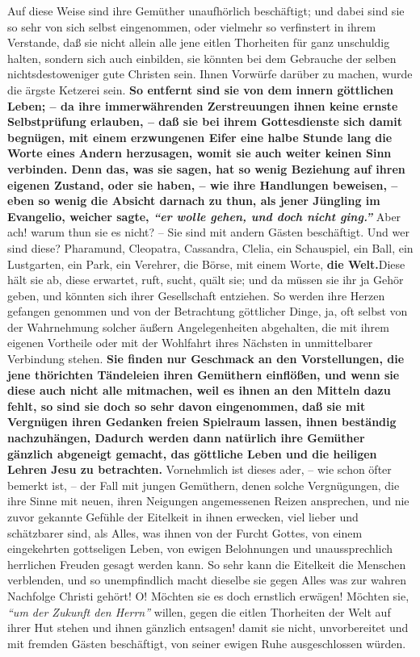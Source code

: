 Auf diese Weise sind ihre Gemüther unaufhörlich beschäftigt; und dabei sind sie
so sehr von sich selbst eingenommen, oder vielmehr so verfinstert in ihrem
Verstande, daß sie nicht allein alle jene eitlen Thorheiten für ganz unschuldig
halten, sondern sich auch einbilden, sie könnten bei dem Gebrauche der selben
nichtsdestoweniger gute Christen sein. Ihnen Vorwürfe
darüber zu machen, wurde
die ärgste Ketzerei sein.
\label{ref:17_04_gottesdienst}
\textbf{So entfernt sind sie von dem innern göttlichen Leben;
-- da ihre immerwährenden Zerstreuungen ihnen keine ernste
Selbstprüfung
erlauben, -- daß sie bei ihrem Gottesdienste
sich damit begnügen, mit einem
erzwungenen Eifer eine halbe Stunde lang die Worte eines Andern herzusagen,
womit sie auch weiter keinen Sinn verbinden. Denn das, was sie sagen, hat so
wenig Beziehung auf ihren eigenen Zustand, oder sie haben, -- wie ihre
Handlungen beweisen, -- eben so wenig die Absicht darnach zu thun, als jener
Jüngling im Evangelio, weicher sagte,
\textit{"`er wolle gehen, und doch nicht ging."'}}
Aber ach! warum thun sie es nicht? -- Sie sind mit andern Gästen beschäftigt.
Und wer sind diese? Pharamund,
Cleopatra, Cassandra,
Clelia, ein Schauspiel, ein
Ball, ein Lustgarten, ein Park, ein Verehrer, die Börse, mit einem
Worte, \textbf{die
Welt.}Diese hält sie ab, diese erwartet, ruft,
sucht, quält sie; und da müssen
sie ihr ja Gehör geben, und könnten sich ihrer Gesellschaft entziehen. So werden
ihre Herzen gefangen genommen und von der Betrachtung göttlicher Dinge, ja, oft
selbst von der Wahrnehmung solcher äußern Angelegenheiten abgehalten, die mit
ihrem eigenen Vortheile oder mit der Wohlfahrt ihres Nächsten in unmittelbarer
Verbindung stehen. \textbf{Sie finden nur Geschmack an den Vorstellungen, die
jene
thörichten Tändeleien ihren Gemüthern einflößen, und wenn sie diese auch nicht
alle mitmachen, weil es ihnen an den Mitteln dazu fehlt, so sind sie doch so
sehr davon eingenommen, daß sie mit Vergnügen ihren Gedanken freien Spielraum
lassen, ihnen beständig nachzuhängen, Dadurch werden dann natürlich ihre
Gemüther gänzlich abgeneigt gemacht, das göttliche Leben und die heiligen Lehren
Jesu zu betrachten.} Vornehmlich ist dieses ader, -- wie schon öfter bemerkt
ist,
-- der Fall mit jungen Gemüthern, denen solche Vergnügungen, die ihre Sinne mit
neuen, ihren Neigungen angemessenen Reizen ansprechen, und nie zuvor gekannte
Gefühle der Eitelkeit in ihnen erwecken, viel lieber und schätzbarer sind, als
Alles, was ihnen von der Furcht Gottes, von einem eingekehrten gottseligen
Leben, von ewigen Belohnungen und unaussprechlich herrlichen Freuden gesagt
werden kann. So sehr kann die Eitelkeit die Menschen verblenden, und so
unempfindlich macht dieselbe sie gegen Alles was zur wahren Nachfolge Christi
gehört! O! Möchten sie es doch ernstlich erwägen! Möchten sie,
\textit{"`um der Zukunft
den Herrn"'} willen, gegen die eitlen Thorheiten der Welt auf ihrer Hut stehen
und ihnen gänzlich entsagen! damit sie nicht, unvorbereitet und mit fremden
Gästen beschäftigt, von seiner ewigen Ruhe ausgeschlossen würden.

